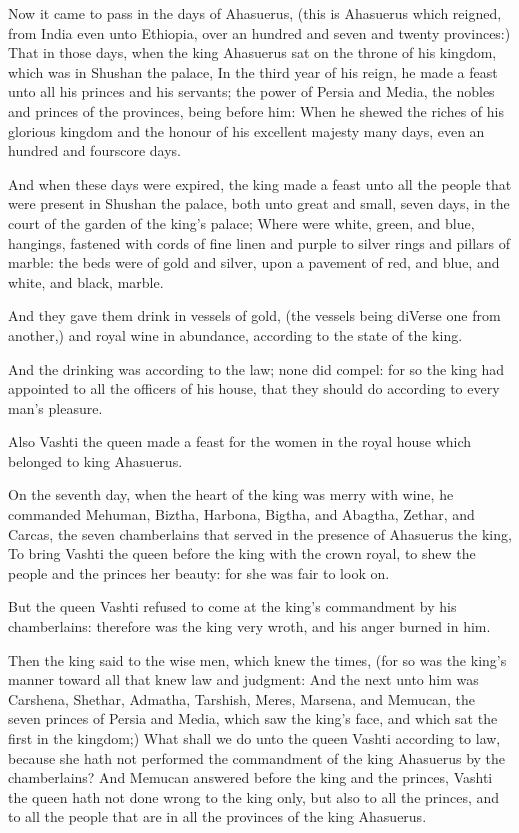 \Chapter
\Verse Now it came to pass in the days of Ahasuerus, (this is Ahasuerus which reigned, from India even unto Ethiopia, over an hundred and seven and twenty provinces:) \Verse That in those days, when the king Ahasuerus sat on the throne of his kingdom, which was in Shushan the palace, \Verse In the third year of his reign, he made a feast unto all his princes and his servants; the power of Persia and Media, the nobles and princes of the provinces, being before him: \Verse When he shewed the riches of his glorious kingdom and the honour of his excellent majesty many days, even an hundred and fourscore days.

\Verse And when these days were expired, the king made a feast unto all the people that were present in Shushan the palace, both unto great and small, seven days, in the court of the garden of the king's palace; \Verse Where were white, green, and blue, hangings, fastened with cords of fine linen and purple to silver rings and pillars of marble: the beds were of gold and silver, upon a pavement of red, and blue, and white, and black, marble.

\Verse And they gave them drink in vessels of gold, (the vessels being diVerse one from another,) and royal wine in abundance, according to the state of the king.

\Verse And the drinking was according to the law; none did compel: for so the king had appointed to all the officers of his house, that they should do according to every man's pleasure.

\Verse Also Vashti the queen made a feast for the women in the royal house which belonged to king Ahasuerus.

\Verse On the seventh day, when the heart of the king was merry with wine, he commanded Mehuman, Biztha, Harbona, Bigtha, and Abagtha, Zethar, and Carcas, the seven chamberlains that served in the presence of Ahasuerus the king, \Verse To bring Vashti the queen before the king with the crown royal, to shew the people and the princes her beauty: for she was fair to look on.

\Verse But the queen Vashti refused to come at the king's commandment by his chamberlains: therefore was the king very wroth, and his anger burned in him.

\Verse Then the king said to the wise men, which knew the times, (for so was the king's manner toward all that knew law and judgment: \Verse And the next unto him was Carshena, Shethar, Admatha, Tarshish, Meres, Marsena, and Memucan, the seven princes of Persia and Media, which saw the king's face, and which sat the first in the kingdom;) \Verse What shall we do unto the queen Vashti according to law, because she hath not performed the commandment of the king Ahasuerus by the chamberlains?  \Verse And Memucan answered before the king and the princes, Vashti the queen hath not done wrong to the king only, but also to all the princes, and to all the people that are in all the provinces of the king Ahasuerus.

